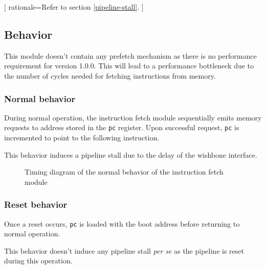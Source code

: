 [
  rationale=Refer to section \ref{pipeline-stall}.
]


\subsection{Behavior}

\begin{content}
  This module doesn't contain any prefetch mechanism as there is no performance requirement for version 1.0.0. This will lead to a performance bottleneck due to the number of cycles needed for fetching instructions from memory.
\end{content}

\subsubsection{Normal behavior}

\begin{content}
  During normal operation, the instruction fetch module sequentially emits memory requests to address stored in the \texttt{pc} register. Upon successful request, \texttt{pc} is incremented to point to the following instruction.

  This behavior induces a pipeline stall due to the delay of the wishbone interface.
\end{content}

\begin{figure}[H]
    \centering
    
    \caption{Timing diagram of the normal behavior of the instruction fetch module}
    \label{fig:ifm-behavior-normal}
\end{figure}

\subsubsection{Reset behavior}

\begin{content}
  Once a reset occurs, \texttt{pc} is loaded with the boot address before returning to normal operation.

  This behavior doesn't induce any pipeline stall \textit{per se} as the pipeline is reset during this operation.
\end{content}

